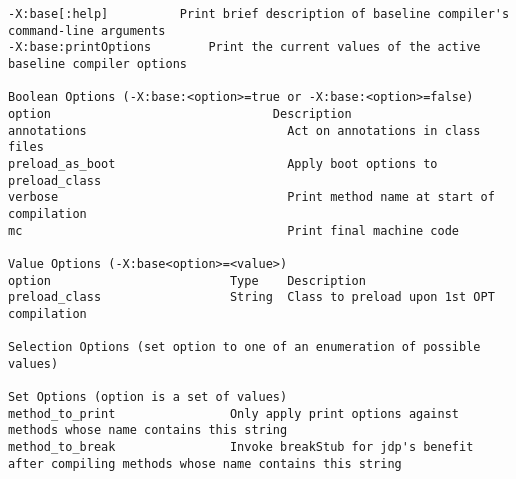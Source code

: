 \begin{verbatim}
-X:base[:help]			Print brief description of baseline compiler's command-line arguments
-X:base:printOptions		Print the current values of the active baseline compiler options

Boolean Options (-X:base:<option>=true or -X:base:<option>=false)
option                               Description
annotations                            Act on annotations in class files
preload_as_boot                        Apply boot options to preload_class
verbose                                Print method name at start of compilation
mc                                     Print final machine code

Value Options (-X:base<option>=<value>)
option                         Type    Description
preload_class                  String  Class to preload upon 1st OPT compilation

Selection Options (set option to one of an enumeration of possible values)

Set Options (option is a set of values)
method_to_print                Only apply print options against methods whose name contains this string
method_to_break                Invoke breakStub for jdp's benefit after compiling methods whose name contains this string
\end{verbatim}

